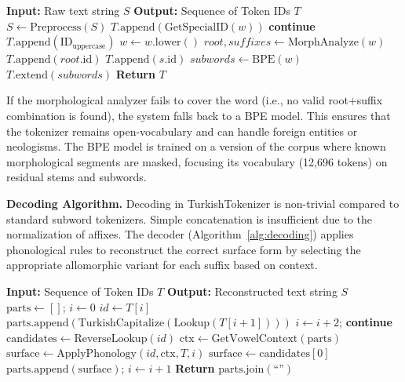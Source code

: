 \begin{algorithm}
\caption{TurkishTokenizer Tokenization Pipeline}
\label{alg:encoding}
\begin{algorithmic}[1]
\State \textbf{Input:} Raw text string $S$
\State \textbf{Output:} Sequence of Token IDs $T$
\State $S \gets \text{Preprocess}(S)$ 
        \State $T.\text{append}(\text{GetSpecialID}(w))$
        \State \textbf{continue}
    \EndIf
        \State $T.\text{append}(\text{ID}_{\text{uppercase}})$
        \State $w \gets w.\text{lower}()$
    \EndIf
    \State $root, suffixes \gets \text{MorphAnalyze}(w)$ 
        \State $T.\text{append}(root.\text{id})$
            \State $T.\text{append}(s.\text{id})$
        \EndFor
    \Else
        \State $subwords \gets \text{BPE}(w)$ 
        \State $T.\text{extend}(subwords)$
    \EndIf
\EndFor
\State \textbf{Return} $T$
\end{algorithmic}
\end{algorithm}

If the morphological analyzer fails to cover the word (i.e., no valid root+suffix combination is found), the system falls back to a BPE model. This ensures that the tokenizer remains open-vocabulary and can handle foreign entities or neologisms. The BPE model is trained on a version of the corpus where known morphological segments are masked, focusing its vocabulary (12,696 tokens) on residual stems and subwords.

\textbf{Decoding Algorithm.} Decoding in TurkishTokenizer is non-trivial compared to standard subword tokenizers. Simple concatenation is insufficient due to the normalization of affixes. The decoder (Algorithm~\ref{alg:decoding}) applies phonological rules to reconstruct the correct surface form by selecting the appropriate allomorphic variant for each suffix based on context.

\begin{algorithm}[H]
\caption{TurkishTokenizer Decoding Pipeline}
\label{alg:decoding}
\begin{algorithmic}[1]
\State \textbf{Input:} Sequence of Token IDs $T$
\State \textbf{Output:} Reconstructed text string $S$
\State $\text{parts} \gets []$; $i \gets 0$
    \State $id \gets T[i]$
        \State $\text{parts}.\text{append}(\text{TurkishCapitalize}(\text{Lookup}(T[i+1])))$
        \State $i \gets i + 2$; \textbf{continue}
    \EndIf
    \State $\text{candidates} \gets \text{ReverseLookup}(id)$ 
        \State $\text{ctx} \gets \text{GetVowelContext}(\text{parts})$ 
        \State $\text{surface} \gets \text{ApplyPhonology}(id, \text{ctx}, T, i)$
    \Else
        \State $\text{surface} \gets \text{candidates}[0]$
    \EndIf
    \State $\text{parts}.\text{append}(\text{surface})$; $i \gets i + 1$
\EndWhile
\State \textbf{Return} $\text{parts}.\text{join}(\text{``''})$
\end{algorithmic}
\end{algorithm}

